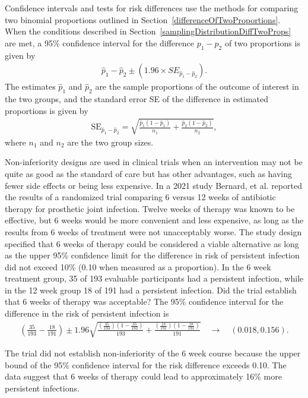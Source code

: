Confidence intervals and tests for risk differences use the methods for comparing two binomial proportions outlined in Section~\ref{differenceOfTwoProportions}. When the conditions described in Section~\ref{samplingDistributionDiffTwoProps} are met, a 95\% confidence interval for the difference $p_1 - p_2$ of two proportions is given by
\begin{align*}
  \hat{p}_1 - \hat{p}_2 \pm ( 1.96 \times SE_{\hat{p}_1 - \hat{p}_2}). 
\end{align*}  
The estimates $\hat{p}_1$ and $\hat{p}_2$ are the sample proportions of the outcome of interest in the two groups, and the standard error SE of the difference in estimated proportions is given by  
\begin{align*}
  \text{SE}_{\hat{p}_1 - \hat{p}_2}
= \sqrt{\frac{\hat{p}_1(1-\hat{p}_1)}{n_1} + \frac{\hat{p}_2(1-\hat{p}_2)}{n_2}},
\end{align*}
where $n_1$ and $n_2$ are the two group sizes.

\begin{examplewrap}
  \begin{nexample}{Non-inferiority designs are used in clinical trials when an intervention may not be quite as good as the standard of care but has other advantages, such as having fewer side effects or being less expensive. In a 2021 study Bernard, et al.  reported the results of a randomized trial comparing 6 versus 12 weeks of antibiotic therapy for prosthetic joint infection.  Twelve weeks of therapy was known to be effective, but 6 weeks would be more convenient and less expensive, as long as the results from 6 weeks of treatment were not unacceptably worse. The study design specified that 6 weeks of therapy could be considered a viable alternative as long as the upper 95\% confidence limit for the difference in risk of persistent infection did not exceed 10\% (0.10 when measured as a proportion).  In the 6 week treatment group, 35 of 193 evaluable participants had a persistent infection, while in the 12 week group 18 of 191 had a persistent infection.  Did the trial establish that 6 weeks of therapy was acceptable?}\label{jointInfectionNonInferiority}
The 95\% confidence interval for the difference in the risk of persistent infection is 
\begin{align*}
   \left( \frac{35}{193} - \frac{18}{191} \right) \pm 1.96  \sqrt{\frac{(\frac{35}{193} )(1 - \frac{35}{193} )}{193} 
   + \frac{(\frac{18}{191})(1 - \frac{18}{191})}{191}} \quad \to \quad (0.018, 0.156).
\end{align*}

The trial did not establish non-inferiority of the 6 week course because the upper bound of the 95\% confidence interval for the risk difference exceeds 0.10.  The data suggest that 6 weeks of therapy could lead to approximately 16\% more persistent infections.

\end{nexample}
\end{examplewrap}

